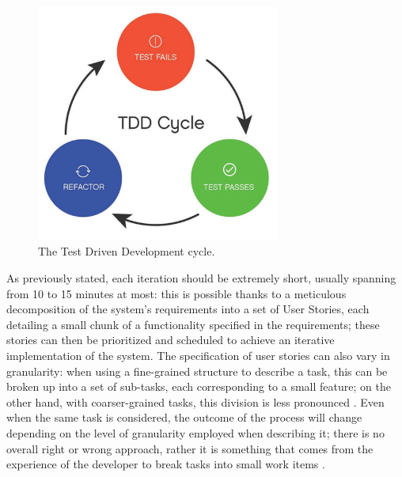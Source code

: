 \begin{figure}[h]
    \centering
    \includegraphics[width=8cm, scale=0.2]{figures/tdd_cycle.jpg}
    \caption{The Test Driven Development cycle.}
    \label{tdd-cycle}
\end{figure}

As previously stated, each \tdd iteration should be extremely short, usually spanning from 10 to 15 minutes at most: this is possible thanks to a meticulous decomposition of the system's requirements into a set of User Stories, each detailing a small chunk of a functionality specified in the requirements; these stories can then be prioritized and scheduled to achieve an iterative implementation of the system. The specification of user stories can also vary in granularity: when using a fine-grained structure to describe a task, this can be broken up into a set of sub-tasks, each corresponding to a small feature; on the other hand, with coarser-grained tasks, this division is less pronounced \cite{DBLP:journals/tse/KaracTJ21}. Even when the same task is considered, the outcome of the \tdd process will change depending on the level of granularity employed when describing it; there is no overall right or wrong approach, rather it is something that comes from the experience of the developer to break tasks into small work items \cite{DBLP:journals/tse/KaracTJ21}.


